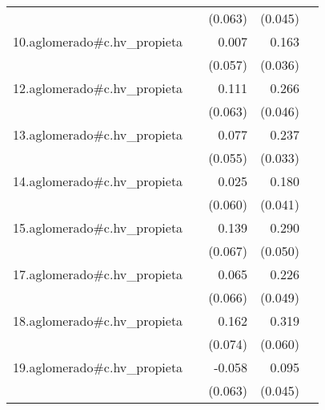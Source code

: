 {\begin{longtable}{l*{4}{D{.}{.}{-1}}}
            &                     &     (0.063)         &     (0.045)         &                     \\
\addlinespace
10.aglomerado#c.hv\_propieta&                     &       0.007         &       0.163\sym{***}&                     \\
            &                     &     (0.057)         &     (0.036)         &                     \\
\addlinespace
12.aglomerado#c.hv\_propieta&                     &       0.111         &       0.266\sym{***}&                     \\
            &                     &     (0.063)         &     (0.046)         &                     \\
\addlinespace
13.aglomerado#c.hv\_propieta&                     &       0.077         &       0.237\sym{***}&                     \\
            &                     &     (0.055)         &     (0.033)         &                     \\
\addlinespace
14.aglomerado#c.hv\_propieta&                     &       0.025         &       0.180\sym{***}&                     \\
            &                     &     (0.060)         &     (0.041)         &                     \\
\addlinespace
15.aglomerado#c.hv\_propieta&                     &       0.139\sym{*}  &       0.290\sym{***}&                     \\
            &                     &     (0.067)         &     (0.050)         &                     \\
\addlinespace
17.aglomerado#c.hv\_propieta&                     &       0.065         &       0.226\sym{***}&                     \\
            &                     &     (0.066)         &     (0.049)         &                     \\
\addlinespace
18.aglomerado#c.hv\_propieta&                     &       0.162\sym{*}  &       0.319\sym{***}&                     \\
            &                     &     (0.074)         &     (0.060)         &                     \\
\addlinespace
19.aglomerado#c.hv\_propieta&                     &      -0.058         &       0.095\sym{*}  &                     \\
            &                     &     (0.063)         &     (0.045)         &                     \\

\end{longtable}}
